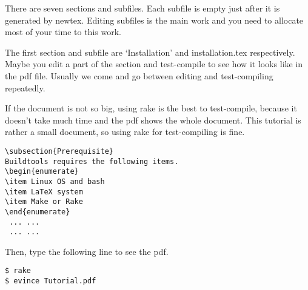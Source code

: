 There are seven sections and subfiles.
Each subfile is empty just after it is generated by newtex.
Editing subfiles is the main work and you need to allocate most of your time to this work.

The first section and subfile are `Installation' and installation.tex respectively.
Maybe you edit a part of the section and test-compile to see how it looks like in the pdf file.
Usually we come and go between editing and test-compiling repeatedly.

If the document is not so big, using rake is the best to test-compile, because it doesn't take much time and the pdf shows the whole document.
This tutorial is rather a small document, so using rake for test-compiling is fine.

\begin{verbatim}
\subsection{Prerequisite}
Buildtools requires the following items.
\begin{enumerate}
\item Linux OS and bash
\item LaTeX system
\item Make or Rake
\end{enumerate}
 ... ...
 ... ...
\end{verbatim}

Then, type the following line to see the pdf.
\begin{verbatim}
$ rake
$ evince Tutorial.pdf
\end{verbatim}

